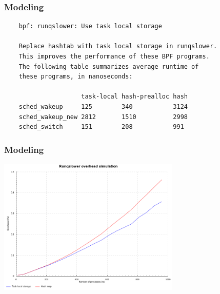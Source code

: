 \documentclass[usenames,dvipsnames, 18pt, compress, aspectratio=169]{beamer}
\begin{document}
\begin{frame}[fragile]{}
    \frametitle{Modeling}

    \begin{center}
        \begin{verbatim}
    bpf: runqslower: Use task local storage

    Replace hashtab with task local storage in runqslower.
    This improves the performance of these BPF programs.
    The following table summarizes average runtime of
    these programs, in nanoseconds:

                     task-local hash-prealloc hash
    sched_wakeup     125        340           3124
    sched_wakeup_new 2812       1510          2998
    sched_switch     151        208           991
        \end{verbatim}
    \end{center}
\end{frame}
\note{
}

\begin{frame}[fragile]{}
    \frametitle{Modeling}

    \begin{center}
        \includegraphics[width=0.65\textwidth,center]{overhead.png}
    \end{center}
\end{frame}
\note{
}
\end{document}
